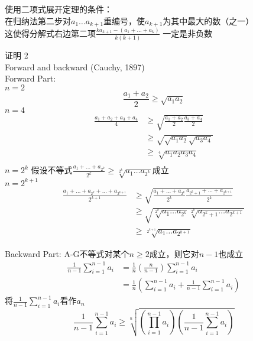 \documentclass[10pt,a4paper]{article}
\begin{document}
	使用二项式展开定理的条件：\\
	在归纳法第二步对$a_1 \dots a_{k+1}  $重编号，使$ a_{k+1} $为其中最大的数（之一）\\
	这使得分解式右边第二项$ \frac{ka_{k+1}-(a_1+\dots+a_k)}{k(k+1)} $ 一定是非负数
	
	
	证明 2\\
	Forward and backward (Cauchy, 1897)\\
	Forward Part:\\
	$ n=2 $ 
	\begin{equation}
		\frac{a_1+a_2}{2}\geq \sqrt{a_1a_2}
	\end{equation}
	$ n=4 $ 
	\begin{equation}
		\begin{aligned}
			\frac{a_1+a_2+a_3+a_4}{4}
			&\geq \sqrt{\frac{a_1+a_2}{2}\frac{a_3+a_4}{2}}\\
			&\geq \sqrt{\sqrt{a_1a_2}\sqrt{a_3a_4}}\\
			&\geq \sqrt[4]{a_1a_2a_3a_4}\\
		\end{aligned}
	\end{equation}
	$ n=2^k $ 假设不等式$ \frac{a_1+\dots +a_{2^k}}{2^k}\geq \sqrt[2^k]{a_1\dots a_{2^k}} $成立\\
	$ n=2^{k+1} $
	\begin{equation}
		\begin{aligned}
			\frac{a_1+\dots+a_{2^k}+\dots+a_{2^{k+1}}}{2^{k+1}}
			&\geq \sqrt{\frac{a_1+\dots +a_{2^k}}{2^k}\frac{a_{2^k+1}+\dots +a_{2^{k+1}}}{2^k}}\\
			&\geq \sqrt{\sqrt[2^k]{a_1\dots a_{2^k}}\sqrt[2^k]{a_{2^k+1}\dots a_{2^{k+1}}}}\\
			&\geq \sqrt[2^{k+1}]{a_1\dots a_{2^{k+1}}}
		\end{aligned}
	\end{equation}
	
	Backward Part:
	A-G不等式对某个$ n\geq 2 $成立，则它对$ n-1 $也成立
	\begin{equation}
		\begin{aligned}
			\frac{1}{n-1}\sum_{i=1}^{n-1}a_i 
			&= \frac{1}{n}(\frac{n}{n-1})\sum_{i=1}^{n-1}a_i\\
			&=\frac{1}{n}(\sum_{i=1}^{n-1}a_i+\frac{1}{n-1}\sum_{i=1}^{n-1}a_i)
		\end{aligned}
	\end{equation}
	将$ \frac{1}{n-1}\sum_{i=1}^{n-1}a_i $看作$ a_n $
	\begin{equation}
		\frac{1}{n-1}\sum_{i=1}^{n-1}a_i
		\geq \sqrt[n]{(\prod_{i=1}^{n-1}a_i) (\frac{1}{n-1}\sum_{i=1}^{n-1}a_i)}
	\end{equation}
	
\end{document}
